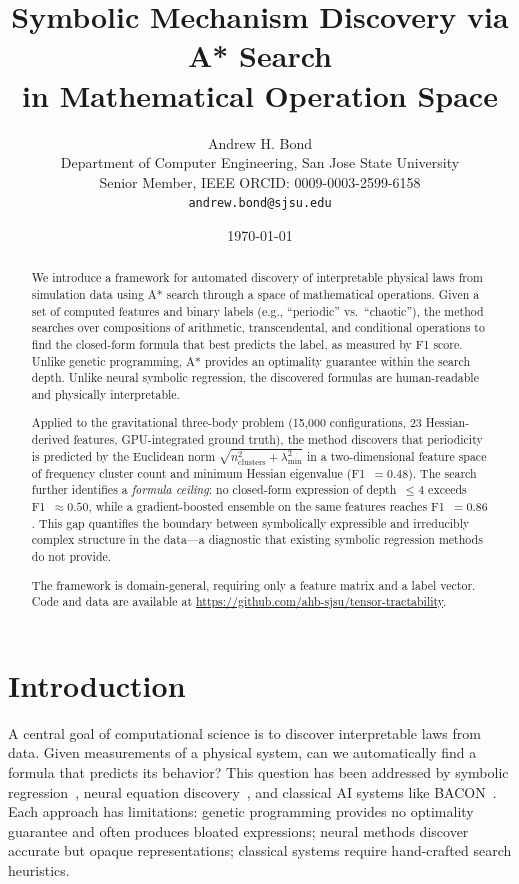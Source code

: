 \documentclass[11pt,a4paper]{article}
\title{Symbolic Mechanism Discovery via A* Search\\in Mathematical Operation Space}
\author{Andrew H. Bond\\
\small Department of Computer Engineering, San Jose State University\\
\small Senior Member, IEEE \quad ORCID: 0009-0003-2599-6158\\
\small \texttt{andrew.bond@sjsu.edu}}
\date{\today}
\begin{document}
\maketitle

\begin{abstract}
We introduce a framework for automated discovery of interpretable
physical laws from simulation data using A* search through a space
of mathematical operations. Given a set of computed features and
binary labels (e.g., ``periodic'' vs.\ ``chaotic''), the method
searches over compositions of arithmetic, transcendental, and
conditional operations to find the closed-form formula that best
predicts the label, as measured by F1 score. Unlike genetic
programming, A* provides an optimality guarantee within the search
depth. Unlike neural symbolic regression, the discovered formulas
are human-readable and physically interpretable.

Applied to the gravitational three-body problem (15,000 configurations,
23 Hessian-derived features, GPU-integrated ground truth), the method
discovers that periodicity is predicted by the Euclidean norm
$\sqrt{n_\mathrm{clusters}^2 + \lambda_\mathrm{min}^2}$ in a
two-dimensional feature space of frequency cluster count and minimum
Hessian eigenvalue (F1~$= 0.48$). The search further identifies a
\emph{formula ceiling}: no closed-form expression of depth~$\leq 4$
exceeds F1~$\approx 0.50$, while a gradient-boosted ensemble on the
same features reaches F1~$= 0.86$. This gap quantifies the boundary
between symbolically expressible and irreducibly complex structure in
the data---a diagnostic that existing symbolic regression methods do
not provide.

The framework is domain-general, requiring only a feature matrix and
a label vector. Code and data are available at
\url{https://github.com/ahb-sjsu/tensor-tractability}.
\end{abstract}

\section{Introduction}

A central goal of computational science is to discover interpretable
laws from data. Given measurements of a physical system, can we
automatically find a formula that predicts its behavior? This question
has been addressed by symbolic regression~\cite{schmidt2009distilling},
neural equation discovery~\cite{udrescu2020ai}, and classical AI
systems like BACON~\cite{langley1987scientific}. Each approach has
limitations: genetic programming provides no optimality guarantee and
often produces bloated expressions; neural methods discover accurate
but opaque representations; classical systems require hand-crafted
search heuristics.
\end{document}

